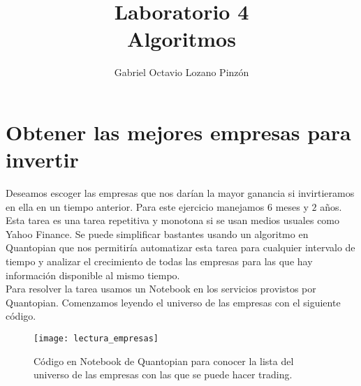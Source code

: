 \documentclass[10pt,a4paper,onecolumn]{article}
\title{Laboratorio 4\\Algoritmos}
\author{Gabriel Octavio Lozano Pinzón}
\begin{document}
\maketitle
\section{Obtener las mejores empresas para invertir}	
Deseamos escoger las empresas que nos darían la mayor ganancia si invirtieramos en ella en un tiempo anterior. Para este ejercicio manejamos $6$ meses y $2$ años. Esta tarea es una tarea repetitiva y monotona si se usan medios usuales como Yahoo Finance. Se puede simplificar bastantes usando un algoritmo en Quantopian que nos permitiría automatizar esta tarea para cualquier intervalo de tiempo y analizar el crecimiento de todas las empresas para las que hay información disponible al mismo tiempo.\\
Para resolver la tarea usamos un Notebook en los servicios provistos por Quantopian.  Comenzamos leyendo el universo de las empresas con el siguiente código.
\begin{figure}[h!]
	\centering
	\texttt{[image: lectura\_empresas]}
	\caption {Código en Notebook de Quantopian para conocer la lista del universo de las empresas con las que se puede hacer trading.}
	\label{fig:lecturaempresas}
\end{figure}
\end{document}
